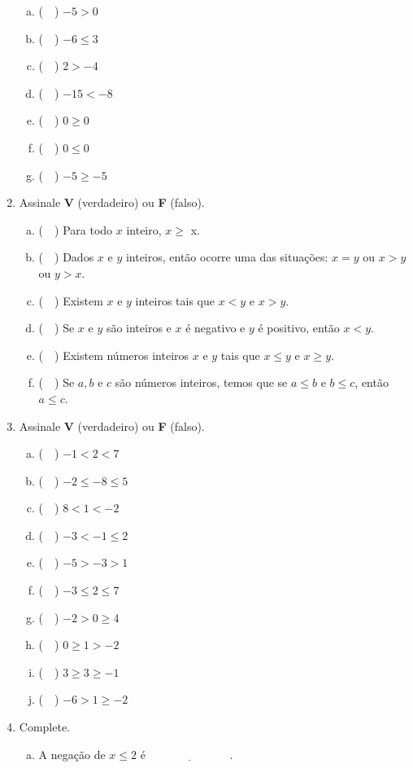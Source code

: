 \documentclass[a4paper,14pt]{article}
\begin{document}
\begin{multicols}{2}
\begin{enumerate}
\begin{enumerate}[a)]
				\item (~~) $-5 > 0$
				\item (~~) $-6 \leq 3$
				\item (~~) $2 > -4$
				\item (~~) $-15 < -8$
				\item (~~) $0 \geq 0$
				\item (~~) $0 \leq 0$
				\item (~~) $-5 \geq -5$
			\end{enumerate}
			\item Assinale \textbf{V} (verdadeiro) ou \textbf{F} (falso).
			\begin{enumerate}[a)]
				\item (~~) Para todo $x$ inteiro, $x \geq$ x.
				\item (~~) Dados $x$ e $y$ inteiros, então ocorre uma das situações: $x = y$ ou $x > y$ ou $y > x$.
				\item (~~) Existem $x$ e $y$ inteiros tais que $x < y$ e $x > y$.
				\item (~~) Se $x$ e $y$ são inteiros e $x$ é negativo e $y$ é positivo, então $x < y$.
				\item (~~) Existem números inteiros $x$ e $y$ tais que $x \leq y$ e $x \geq y$.
				\item (~~) Se $a, b$ e $c$ são números inteiros, temos que se $a \leq b$ e $b \leq c$, então $a \leq c$.
			\end{enumerate}
			\item Assinale \textbf{V} (verdadeiro) ou \textbf{F} (falso).
			\begin{enumerate}[a)]
				\item (~~) $-1 < 2 < 7$
				\item (~~) $-2 \leq -8 \leq 5$
				\item (~~) $8 < 1 < -2$
				\item (~~) $-3 < -1 \leq 2$
				\item (~~) $-5 > -3 > 1$
				\item (~~) $-3 \leq 2 \leq 7$
				\item (~~) $-2 > 0 \geq 4$
				\item (~~) $0 \geq 1 > -2$
				\item (~~) $3 \geq 3 \geq -1$
				\item (~~) $-6 > 1 \geq -2$
			\end{enumerate}
			\item Complete.
			\begin{enumerate}[a)]
				\item A negação de $x \leq 2$ é $\underline{~~~~~~~~~~~~~~~~~~~~~~~~~~~~~~~~}$.

\end{enumerate}
\end{enumerate}
\end{multicols}
\end{document}
